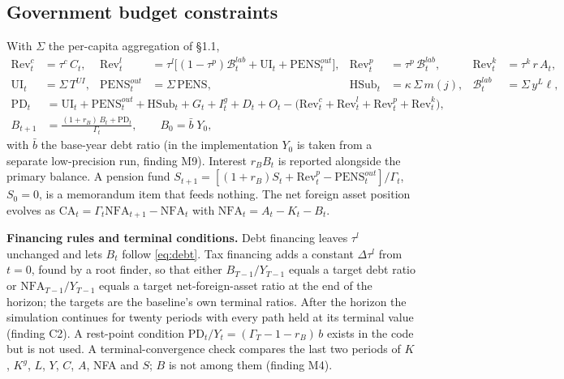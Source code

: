 \documentclass[11pt,a4paper]{article}
\begin{document}
\subsection{Government budget constraints}

With $\Sigma$ the per-capita aggregation of \S1.1,
\begin{align*}
\mathrm{Rev}^c_t &= \tau^c\, C_t, &
\mathrm{Rev}^l_t &= \tau^l\bigl[(1-\tau^p)\mathcal{B}^{lab}_t + \mathrm{UI}_t + \mathrm{PENS}^{out}_t\bigr], &
\mathrm{Rev}^p_t &= \tau^p\,\mathcal{B}^{lab}_t, &
\mathrm{Rev}^k_t &= \tau^k\, r\, A_t,\\
\mathrm{UI}_t &= \Sigma\, T^{UI}, &
\mathrm{PENS}^{out}_t &= \Sigma\, \mathrm{PENS}, &
\mathrm{HSub}_t &= \kappa\,\Sigma\, m(j), &
\mathcal{B}^{lab}_t &= \Sigma\, y^L \ell,
\end{align*}
\begin{align}
\mathrm{PD}_t &= \mathrm{UI}_t + \mathrm{PENS}^{out}_t + \mathrm{HSub}_t + G_t + I^g_t + D_t + O_t - \bigl(\mathrm{Rev}^c_t + \mathrm{Rev}^l_t + \mathrm{Rev}^p_t + \mathrm{Rev}^k_t\bigr), \label{eq:pd}\\
B_{t+1} &= \frac{(1+r_B)\, B_t + \mathrm{PD}_t}{\Gamma_t}, \qquad B_0 = \bar{b}\; Y_0, \label{eq:debt}
\end{align}
with $\bar{b}$ the base-year debt ratio (in the implementation $Y_0$ is taken from a separate low-precision run, finding M9). Interest $r_B B_t$ is reported alongside the primary balance. A pension fund $S_{t+1} = [(1+r_B) S_t + \mathrm{Rev}^p_t - \mathrm{PENS}^{out}_t]/\Gamma_t$, $S_0 = 0$, is a memorandum item that feeds nothing. The net foreign asset position evolves as $\mathrm{CA}_t = \Gamma_t \mathrm{NFA}_{t+1} - \mathrm{NFA}_t$ with $\mathrm{NFA}_t = A_t - K_t - B_t$.

\textbf{Financing rules and terminal conditions.} Debt financing leaves $\tau^l$ unchanged and lets $B_t$ follow \eqref{eq:debt}. Tax financing adds a constant $\Delta\tau^l$ from $t = 0$, found by a root finder, so that either $B_{T-1}/Y_{T-1}$ equals a target debt ratio or $\mathrm{NFA}_{T-1}/Y_{T-1}$ equals a target net-foreign-asset ratio at the end of the horizon; the targets are the baseline's own terminal ratios. After the horizon the simulation continues for twenty periods with every path held at its terminal value (finding C2). A rest-point condition $\mathrm{PD}_t/Y_t = (\Gamma_T - 1 - r_B)\, b$ exists in the code but is not used. A terminal-convergence check compares the last two periods of $K$, $K^g$, $L$, $Y$, $C$, $A$, NFA and $S$; $B$ is not among them (finding M4).
\end{document}
